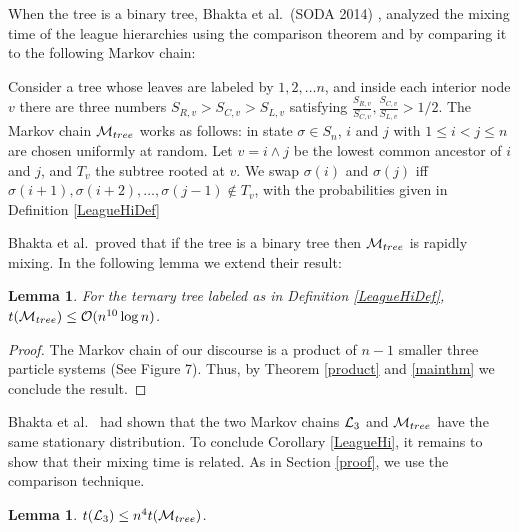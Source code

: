 \documentclass[10 pt]{article}
\newcommand{\M}{{\cal M}}
\newcommand{\Lc}{{\cal L}_3}
\newtheorem{lemma}[thm]{Lemma}
\begin{document}
 
When the tree is a binary tree, Bhakta et al.\ (SODA 2014) \cite{Dana}, analyzed the mixing time of the league hierarchies using the comparison
theorem and by comparing it to the following Markov chain:

\smallskip

Consider a tree whose leaves are labeled by $1,2,\dots n$, and inside each interior node $v$ there are three numbers $S_{R,v}>S_{C,v}> S_{L,v}$
satisfying $\frac{S_{R,v}}{S_{C,v}}, \frac{S_{C,v}}{S_{L,v}}>1/2$. The Markov chain $\M_{tree}$ works as follows:
in state $\sigma\in S_n$, $i$ and $j$ with $1\leq i<j \leq n$ are chosen uniformly at random. Let $v=i\wedge j$ be the lowest common ancestor
of $i$ and $j$, and  $T_v$ the subtree rooted at $v$. We swap $\sigma(i)$ and $\sigma(j)$ iff $\sigma(i+1),\sigma(i+2),\dots, \sigma(j-1)\notin T_v$,
with the probabilities given in Definition \ref{LeagueHiDef}
 
Bhakta et al.\ proved that if the tree is a binary tree then $\M_{tree}$ is rapidly mixing. In the following lemma we extend their result:  
 
\begin{lemma} For the ternary tree labeled as in Definition \ref{LeagueHiDef}, $t (\M_{tree})\leq  {\cal O}(n^{10}\log n)$.
 
\end{lemma}
 
 

\begin{proof}
The  Markov chain of our discourse is a product of $n-1$ smaller three particle systems (See Figure 7). Thus, by
Theorem \ref{product} and \ref{mainthm} we conclude the result. 
\end{proof}
 


Bhakta et al.\ \cite{Dana} had shown that the two Markov chains $\Lc$ and $\M_{tree}$ have the same stationary distribution.
To conclude  Corollary \ref{LeagueHi}, it remains to show that their mixing time is related. As in Section \ref{proof}, we use the comparison technique. 


\begin{lemma}
$t(\Lc)\leq n^4 t(\M_{tree})$.
\end{lemma}
\end{document}
